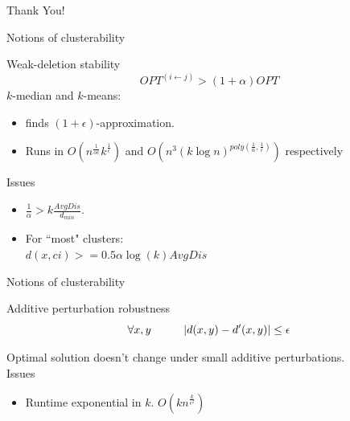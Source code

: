 \documentclass{beamer}
\begin{document}
\begin{frame}
    \Huge{\centerline{Thank You!}}
\end{frame}

\begin{frame}{Notions of clusterability}
	
	{\color{blue} Weak-deletion stability}\\
	\vspace{0.5cm}$$OPT^{(i \leftarrow j)} > (1 + \alpha)OPT$$
	$k$-median and $k$-means:
	\begin{itemize}
		\item finds $(1+\epsilon)$-approximation.
		\item Runs in $O(n^{\frac{1}{\alpha \epsilon}} k^{\frac{1}{\epsilon}})$ and $O(n^3 (k\log n)^{poly(\frac{1}{\alpha}, \frac{1}{\epsilon})})$ respectively
	\end{itemize}
	
	\vspace{0.5cm}\alert{Issues}\\
	\begin{itemize}
	\item $\frac{1}{\alpha} > k \frac{AvgDis}{d_{min}}$. 
	\item For ``most" clusters:\\ $d(x, ci) >= 0.5 \alpha \log(k) AvgDis$
	\end{itemize}
\end{frame}

\begin{frame}{Notions of clusterability}
	
	{\color{blue} Additive perturbation robustness}\\
	$$\forall x, y  \hspace{0.4in}|d(x, y) - d'(x, y)| \le \epsilon\vspace{0.5cm}$$

	Optimal solution doesn't change under small additive perturbations.\\
	
	\vspace{1cm}\alert{Issues}\\
	\begin{itemize}
		\item Runtime exponential in $k$. $O(kn^{\frac{k}{\epsilon^2}})$
	\end{itemize}
\end{frame}
\end{document}
